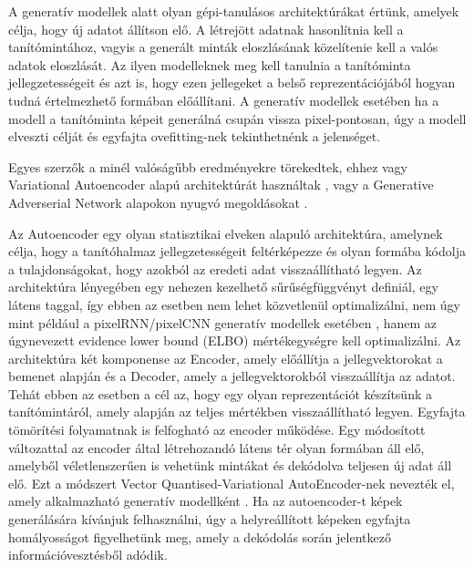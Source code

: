 
A generatív modellek alatt olyan gépi-tanulásos architektúrákat értünk, amelyek célja, hogy új adatot állítson elő. A létrejött adatnak hasonlítnia kell a tanítómintához, vagyis a generált minták eloszlásának közelítenie kell a valós adatok eloszlását. Az ilyen modelleknek meg kell tanulnia a tanítóminta jellegzetességeit és azt is, hogy ezen jellegeket a belső reprezentációjából hogyan tudná értelmezhető formában előállítani. A generatív modellek esetében ha a modell a tanítóminta képeit generálná csupán vissza pixel-pontosan, úgy a modell elveszti célját és egyfajta ovefitting-nek tekinthetnénk a jelenséget.

Egyes szerzők a minél valóságűbb eredményekre törekedtek, ehhez vagy Variational Autoencoder alapú architektúrát használtak \cite{ramesh2021zero}, vagy a Generative Adverserial Network alapokon nyugvó megoldásokat \cite{dong2021unsupervised, reed2016learning, xu2018attngan, zhang2017stackgan}.

Az Autoencoder egy olyan statisztikai elveken alapuló architektúra, amelynek célja, hogy a tanítóhalmaz jellegzetességeit feltérképezze és olyan formába kódolja a tulajdonságokat, hogy azokból az eredeti adat visszaállítható legyen. Az architektúra lényegében egy nehezen kezelhető sűrűségfüggvényt definiál, egy látens taggal, így ebben az esetben nem lehet közvetlenül optimalizálni, nem úgy mint például a pixelRNN/pixelCNN generatív modellek esetében \cite{oord2016conditional}, hanem az úgynevezett evidence lower bound (ELBO) mértékegységre kell optimalizálni\cite{oord2017neural}. Az architektúra két komponense az Encoder, amely előállítja a jellegvektorokat a bemenet alapján és a Decoder, amely a jellegvektorokból visszaállítja az adatot. Tehát ebben az esetben a cél az, hogy egy olyan reprezentációt készítsünk a tanítómintáról, amely alapján az teljes mértékben visszaállítható legyen. Egyfajta tömörítési folyamatnak is felfogható az encoder működése. Egy módosított változattal az encoder által létrehozandó látens tér olyan formában áll elő, amelyből véletlenszerűen is vehetünk mintákat és dekódolva teljesen új adat áll elő. Ezt a módszert Vector Quantised-Variational AutoEncoder-nek nevezték el, amely alkalmazható generatív modellként \cite{oord2017neural}.
Ha az autoencoder-t képek generálására kívánjuk felhasználni, úgy a helyreállított képeken egyfajta homályosságot figyelhetünk meg, amely a dekódolás során jelentkező információvesztésből adódik.

